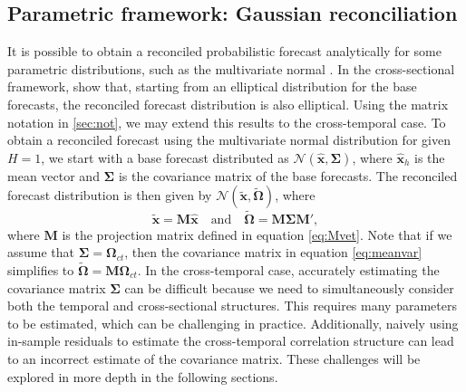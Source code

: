 \documentclass[a4paper,11pt]{article}
\newcommand{\xvet}{\bm{x}}
\newcommand{\Mvet}{\bm{M}}
\newcommand{\Omegavet}{\bm{\Omega}}
\newcommand{\Sigmavet}{\bm{\Sigma}}
\theoremstyle{definition}
\begin{document}
\subsection{Parametric framework: Gaussian reconciliation}\label{ssec:prob_pf}

It is possible to obtain a reconciled probabilistic forecast analytically for some parametric distributions, such as the multivariate normal \citep{panagiotelis2023, wickramasuriya2021b, corani2021, eckert2021}. In the cross-sectional framework, \cite{panagiotelis2023} show that, starting from an elliptical distribution for the base forecasts, the reconciled forecast distribution is also elliptical. Using the matrix notation in \autoref{sec:not}, we may extend this results to the cross-temporal case.
To obtain a reconciled forecast using the multivariate normal distribution for given $H = 1$, we start with a base forecast distributed as $\mathcal{N}(\widehat{\xvet}, \Sigmavet)$, where $\widehat{\xvet}_h$ is the mean vector and $\Sigmavet$ is the covariance matrix of the base forecasts. The reconciled forecast distribution is then given by $\mathcal{N}(\widetilde{\xvet}, \widetilde{\Omegavet})$, where
\begin{equation}\label{eq:meanvar}
	\widetilde{\xvet} = \Mvet\widehat{\xvet} \quad \mbox{and} \quad \widetilde{\Omegavet} = \Mvet \Sigmavet \Mvet',
\end{equation}
where $\Mvet$ is the projection matrix defined in equation \eqref{eq:Mvet}.
Note that if we assume that $\Sigmavet = \Omegavet_{ct}$, then the covariance matrix in equation \eqref{eq:meanvar} simplifies to $\widetilde{\Omegavet} = \Mvet \Omegavet_{ct}$.
In the cross-temporal case, accurately estimating the covariance matrix $\Sigmavet$ can be difficult because we need to simultaneously consider both the temporal and cross-sectional structures. This requires many parameters to be estimated, which can be challenging in practice. Additionally, naively using in-sample residuals to estimate the cross-temporal correlation structure can lead to an incorrect estimate of the covariance matrix. These challenges will be explored in more depth in the following sections.
\end{document}
